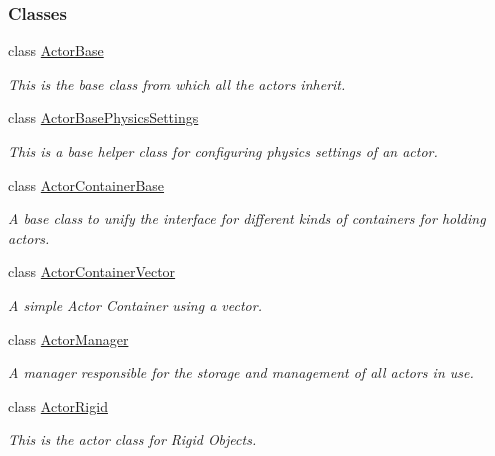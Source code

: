 \subsubsection*{Classes}
\begin{DoxyCompactItemize}
\item 
class \hyperlink{classMezzanine_1_1ActorBase}{ActorBase}
\begin{DoxyCompactList}\small\item\em This is the base class from which all the actors inherit. \item\end{DoxyCompactList}\item 
class \hyperlink{classMezzanine_1_1ActorBasePhysicsSettings}{ActorBasePhysicsSettings}
\begin{DoxyCompactList}\small\item\em This is a base helper class for configuring physics settings of an actor. \item\end{DoxyCompactList}\item 
class \hyperlink{classMezzanine_1_1ActorContainerBase}{ActorContainerBase}
\begin{DoxyCompactList}\small\item\em A base class to unify the interface for different kinds of containers for holding actors. \item\end{DoxyCompactList}\item 
class \hyperlink{classMezzanine_1_1ActorContainerVector}{ActorContainerVector}
\begin{DoxyCompactList}\small\item\em A simple Actor Container using a vector. \item\end{DoxyCompactList}\item 
class \hyperlink{classMezzanine_1_1ActorManager}{ActorManager}
\begin{DoxyCompactList}\small\item\em A manager responsible for the storage and management of all actors in use. \item\end{DoxyCompactList}\item 
class \hyperlink{classMezzanine_1_1ActorRigid}{ActorRigid}
\begin{DoxyCompactList}\small\item\em This is the actor class for Rigid Objects. \item\end{DoxyCompactList}\item 

\end{DoxyCompactItemize}
